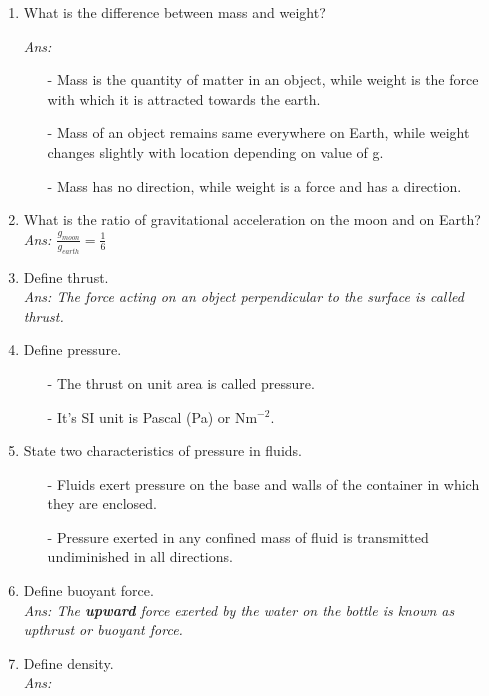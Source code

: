 \documentclass[12pt]{article}
\begin{document}
\begin{enumerate}
{\begin{itemize}
			\end{itemize}
		}
	\item What is the difference between mass and weight? \\
		{\itshape Ans:
			\begin{itemize}
				\item[-] Mass is the quantity of matter in an object, while weight is the force with which it is attracted towards the earth.
				\item[-] Mass of an object remains same everywhere on Earth, while weight changes slightly with location depending on value of g.
				\item[-] Mass has no direction, while weight is a force and has a direction.
			\end{itemize}
		}
	\item What is the ratio of gravitational acceleration on the moon and on Earth? \\
		{\itshape Ans: $\frac{g_{moon}}{g_{earth}} = \frac{1}{6} $}
	\item Define thrust. \\
		{\itshape Ans:
			The force acting on an object perpendicular to
			the surface is called thrust.
		}
	\item Define pressure. \\
		{\itshape
			\begin{itemize}
				\item[-] The thrust on unit area is called pressure.
				\item[-] It's SI unit is Pascal (Pa) or Nm$^{-2}$.
			\end{itemize}
		}
	\item State two characteristics of pressure in fluids. \\
		{\itshape
			\begin{itemize}
				\item[-] Fluids exert pressure on the base and walls of the
				container in which they are enclosed. 
				\item[-] Pressure exerted in any confined mass of fluid is
				transmitted undiminished in all directions.
			\end{itemize}
		}
	\item Define buoyant force. \\
		{\itshape Ans:
			The \textbf{upward} force exerted by the water on
			the bottle is known as upthrust or buoyant
			force.
		}
	\item Define density. \\
		{\itshape Ans:
}
\end{enumerate}
\end{document}
